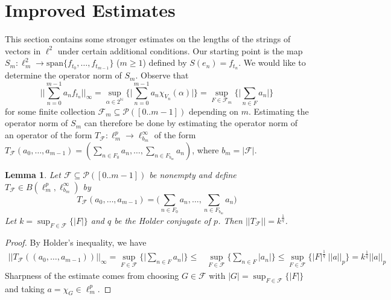 \documentclass{article}
\newtheorem{lemma}[theorem]{Lemma}
\newcommand{\spn}{\text{span}}
\newcommand{\N}{\mathbb N}
\begin{document}
\section{Improved Estimates}

This section contains some stronger estimates on the lengths of the strings of vectors in $\ell^2$ under certain additional conditions. Our starting point is the map $S_m : \ell^2_m\rightarrow \spn\{f_{t_0},\ldots, f_{t_{m-1}}\}$ ($m\geq 1$) defined by $S(e_n) = f_{t_n}$. We would like to determine the operator norm of $S_m$. Observe that
\begin{equation*}
\bigg|\bigg|\sum_{n=0}^{m-1} a_n f_{t_n}\bigg|\bigg|_\infty = \sup_{\alpha\in 2^\N}\bigg\{\bigg|\sum_{n=0}^{m-1} a_n \chi_{V_n}(\alpha)\bigg|\bigg\} = \sup_{F\in\mathcal F_m}\bigg\{\bigg|\sum_{n\in F} a_n\bigg|\bigg\}
\end{equation*}
for some finite collection $\mathcal F_m\subseteq\mathcal P([0..m-1])$ depending on $m$. Estimating the operator norm of $S_m$ can therefore be done by estimating the operator norm of an operator of the form $T_\mathcal{F} : \ell^p_m\rightarrow\ell^{\infty}_{b_m}$ of the form $T_\mathcal{F}(a_0,\ldots, a_{m-1}) = (\sum_{n\in F_0} a_n, \ldots, \sum_{n\in F_{b_m}} a_n)$, where $b_m = |\mathcal F|$.

\begin{lemma}\label{ptoinf}
Let $\mathcal F\subseteq\mathcal P([0..m-1])$ be nonempty and define $T_\mathcal{F}\in B(\ell_m^p,\ell_{b_m}^\infty)$ by 
\begin{equation*}
T_\mathcal{F}(a_0,\ldots, a_{m-1}) = \bigg(\sum_{n\in F_0} a_n, \ldots, \sum_{n\in F_{b_m}} a_n\bigg)
\end{equation*} 
Let $k = \sup_{F\in\mathcal{F}}\{|F|\}$ and $q$ be the Holder conjugate of $p$. Then $||T_\mathcal{F}|| = k^\frac{1}{q}$.
\end{lemma}

\begin{proof}
By Holder's inequality, we have
\begin{align*}
||T_\mathcal{F}((a_0,\ldots, a_{m-1}))||_\infty = \sup_{F\in\mathcal F}\bigg\{\bigg|\sum_{n\in F} a_n\bigg|\bigg\}\leq &\sup_{F\in\mathcal F}\bigg\{\sum_{n\in F}| a_n|\bigg\}\leq \sup_{F\in\mathcal F}\{|F|^\frac{1}{q}\:||a||_p\}= k^\frac{1}{q}||a||_p
\end{align*}
Sharpness of the estimate comes from choosing $G\in\mathcal F$ with $|G| = \sup_{F\in\mathcal F}\{|F|\}$ and taking $a = \chi_G\in\ell^p_m$.
\end{proof}
\end{document}
